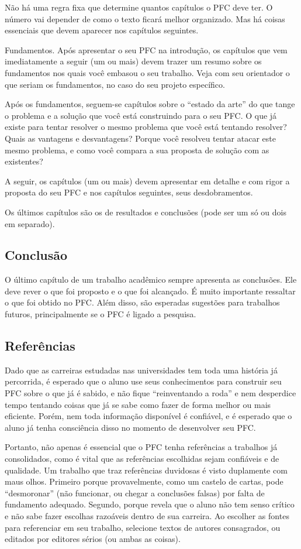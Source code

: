 Não há uma regra fixa que determine quantos capítulos o PFC deve ter. O número vai depender de como o texto ficará melhor organizado. Mas há coisas essenciais que devem aparecer nos capítulos seguintes.

Fundamentos. Após apresentar o seu PFC na introdução, os capítulos que vem imediatamente a seguir (um ou mais) devem trazer um resumo sobre os fundamentos nos quais você embasou o seu trabalho. Veja com seu orientador o que seriam os fundamentos, no caso do seu projeto específico.

Após os fundamentos, seguem-se capítulos sobre o “estado da arte” do que tange o problema e a solução que você está construindo para o seu PFC. O que já existe para tentar resolver o mesmo problema que você está tentando resolver? Quais as vantagens e desvantagens? Porque você resolveu tentar atacar este mesmo problema, e como você compara a sua proposta de solução com as existentes?

A seguir, os capítulos (um ou mais) devem apresentar em detalhe e com rigor a proposta do seu PFC e nos capítulos seguintes, seus desdobramentos.

Os últimos capítulos são os de resultados e conclusões (pode ser um só ou dois em separado).

\subsection{Conclusão}

O último capítulo de um trabalho acadêmico sempre apresenta as conclusões. Ele deve rever o que foi proposto e o que foi alcançado. É muito importante ressaltar o que foi obtido no PFC. Além disso, são esperadas sugestões para trabalhos futuros, principalmente se o PFC é ligado a pesquisa.

\subsection{Referências}

Dado que as carreiras estudadas nas universidades tem toda uma história já percorrida, é esperado que o aluno use seus conhecimentos para construir seu PFC sobre o que já é sabido, e não fique “reinventando a roda” e nem desperdice tempo tentando coisas que já se sabe como fazer de forma melhor ou mais eficiente. Porém, nem toda informação disponível é confiável, e é esperado que o aluno já tenha consciência disso no momento de desenvolver seu PFC.

Portanto, não apenas é essencial que o PFC tenha referências a trabalhos já consolidados, como é vital que as referências escolhidas sejam confiáveis e de qualidade. Um trabalho que traz referências duvidosas é visto duplamente com maus olhos. Primeiro porque provavelmente, como um castelo de cartas, pode “desmoronar” (não funcionar, ou chegar a conclusões falsas) por falta de fundamento adequado. Segundo, porque revela que o aluno não tem senso crítico e não sabe fazer escolhas razoáveis dentro de sua carreira. Ao escolher as fontes para referenciar em seu trabalho, selecione textos de autores consagrados, ou editados por editores sérios (ou ambas as coisas).

